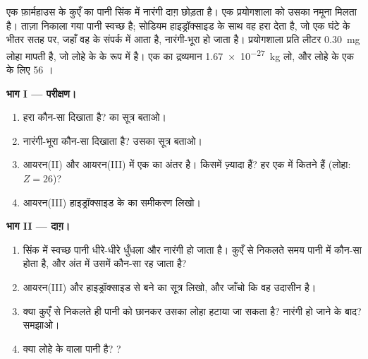 \begin{problem}
\label{pb:g9:ions:1}
एक फ़ार्महाउस के कुएँ का पानी सिंक में नारंगी दाग़ छोड़ता है। एक प्रयोगशाला को
उसका नमूना मिलता है। ताज़ा निकाला गया पानी स्वच्छ है; सोडियम हाइड्रॉक्साइड के
साथ वह हरा  देता है, जो एक घंटे के भीतर सतह पर, जहाँ वह  के संपर्क में
आता है, नारंगी-भूरा हो जाता है। प्रयोगशाला प्रति लीटर \qty{0.30}{mg} लोहा
मापती है, जो लोहे के  के रूप में है। एक  का द्रव्यमान
\qty{1.67e-27}{kg} लो, और लोहे के एक  के लिए 56
।

\medskip
\noindent\textbf{भाग I --- परीक्षण।}
\begin{enumerate}
  \item हरा  कौन-सा  दिखाता है?  का सूत्र
        बताओ।
  \item नारंगी-भूरा  कौन-सा  दिखाता है? उसका
        सूत्र बताओ।
  \item आयरन(II)  और आयरन(III)  में एक  का अंतर है।
        किसमें ज़्यादा  हैं? हर एक में कितने  हैं
        (लोहा: $Z = 26$)?
  \item आयरन(III) हाइड्रॉक्साइड के  का समीकरण लिखो।
\end{enumerate}

\medskip
\noindent\textbf{भाग II --- दाग़।}
\begin{enumerate}[resume]
  \item सिंक में स्वच्छ पानी धीरे-धीरे धुँधला और नारंगी हो जाता है। कुएँ से
        निकलते समय पानी में कौन-सा  होता है, और अंत में उसमें कौन-सा
         रह जाता है?
  \item आयरन(III)  और हाइड्रॉक्साइड  से बने  का सूत्र
        लिखो, और जाँचो कि वह उदासीन है।
  \item क्या कुएँ से निकलते ही पानी को छानकर उसका लोहा हटाया जा सकता है?
        नारंगी हो जाने के बाद? समझाओ।
  \item क्या लोहे के  वाला पानी  है? ?
\end{enumerate}


\end{problem}
